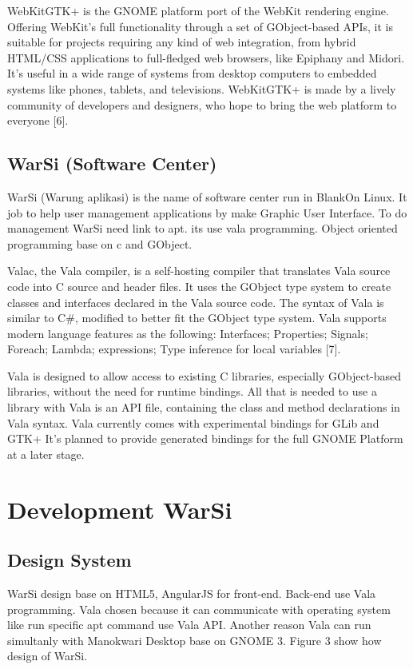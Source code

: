 \documentclass[conference, letterpaper]{IEEEtran}
\begin{document}
WebKitGTK+ is the GNOME platform port of the WebKit rendering engine. Offering WebKit’s full functionality through a set of GObject-based APIs, it is suitable for projects requiring any kind of web integration, from hybrid HTML/CSS applications to full-fledged web browsers, like Epiphany and Midori. It’s useful in a wide range of systems from desktop computers to embedded systems like phones, tablets, and televisions. WebKitGTK+ is made by a lively community of developers and designers, who hope to bring the web platform to everyone [6].

\subsection{WarSi (Software Center)}
WarSi (Warung aplikasi) is the name of software center run in BlankOn Linux. It job to help user management applications by make Graphic User Interface. To do management WarSi need link to apt. its use vala programming. Object oriented programming base on c and GObject. 

Valac, the Vala compiler, is a self-hosting compiler that translates Vala source code into C source and header files. It uses the GObject type system to create classes and interfaces declared in the Vala source code. The syntax of Vala is similar to C\#, modified to better fit the GObject type system. Vala supports modern language features as the following: Interfaces; Properties; Signals; Foreach; Lambda; expressions; Type inference for local variables [7].

Vala is designed to allow access to existing C libraries, especially GObject-based libraries, without the need for runtime bindings. All that is needed to use a library with Vala is an API file, containing the class and method declarations in Vala syntax. Vala currently comes with experimental bindings for GLib and GTK+ It's planned to provide generated bindings for the full GNOME Platform at a later stage.

\section{Development WarSi}
\subsection{Design System}

WarSi design base on HTML5, AngularJS for front-end. Back-end use Vala programming. Vala chosen because it can communicate with operating system like run specific apt command use Vala API. Another reason Vala can run simultanly with Manokwari Desktop base on GNOME 3. Figure 3 show how design of WarSi.
\end{document}
